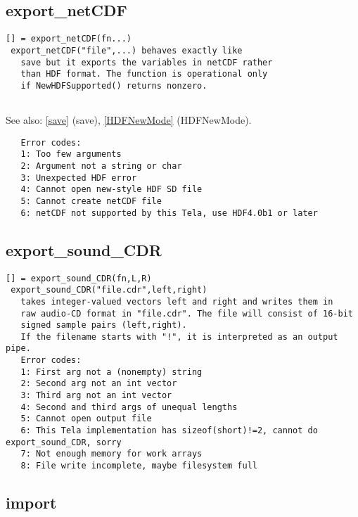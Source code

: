 \documentclass[a4paper]{article}
\begin{document}
\subsection{export\_netCDF\label{export_netCDF}}

\begin{tscreen}
\begin{verbatim}
[] = export_netCDF(fn...)
 export_netCDF("file",...) behaves exactly like
   save but it exports the variables in netCDF rather
   than HDF format. The function is operational only
   if NewHDFSupported() returns nonzero.
   
\end{verbatim}

See also: \ref{save} {(save)}, \ref{HDFNewMode} {(HDFNewMode)}.
\begin{verbatim}
   Error codes:
   1: Too few arguments
   2: Argument not a string or char
   3: Unexpected HDF error
   4: Cannot open new-style HDF SD file
   5: Cannot create netCDF file
   6: netCDF not supported by this Tela, use HDF4.0b1 or later
\end{verbatim}
\end{tscreen}



\subsection{export\_sound\_CDR\label{export_sound_CDR}}

\begin{tscreen}
\begin{verbatim}
[] = export_sound_CDR(fn,L,R)
 export_sound_CDR("file.cdr",left,right)
   takes integer-valued vectors left and right and writes them in
   raw audio-CD format in "file.cdr". The file will consist of 16-bit
   signed sample pairs (left,right).
   If the filename starts with "!", it is interpreted as an output pipe.
   Error codes:
   1: First arg not a (nonempty) string
   2: Second arg not an int vector
   3: Third arg not an int vector
   4: Second and third args of unequal lengths
   5: Cannot open output file
   6: This Tela implementation has sizeof(short)!=2, cannot do export_sound_CDR, sorry
   7: Not enough memory for work arrays
   8: File write incomplete, maybe filesystem full
\end{verbatim}
\end{tscreen}



\subsection{import\label{import}}
\end{document}
